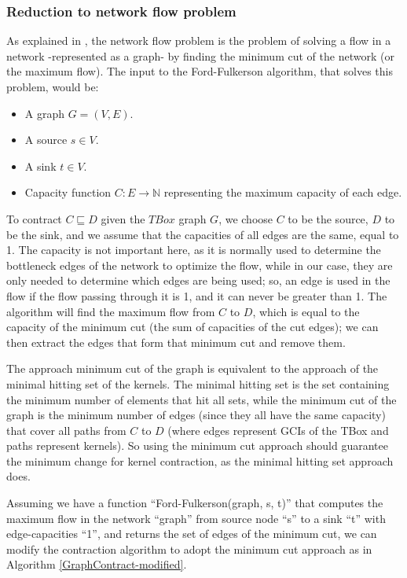 \subsubsection{Reduction to network flow problem}
As explained in \cite{alg}, the network flow problem is the problem of solving a flow in a network -represented as a graph- by finding the minimum cut of the network (or the maximum flow). The input to the Ford-Fulkerson algorithm, that solves this problem, would be:
\begin{itemize}
\item A graph $G = (V, E)$.
\item A source $s \in V$.
\item A sink $t \in V$.
\item Capacity function $C:E \rightarrow \mathbb{N}$ representing the maximum capacity of each edge.
\end{itemize}

To contract $C \sqsubseteq D$ given the $TBox$ graph $G$, we choose $C$ to be the source, $D$ to be the sink, and we assume that the capacities of all edges are the same, equal to 1. The capacity is not important here, as it is normally used to determine the bottleneck edges of the network to optimize the flow, while in our case, they are only needed to determine which edges are being used; so, an edge is used in the flow if the flow passing through it is 1, and it can never be greater than 1. The algorithm will find the maximum flow from $C$ to $D$, which is equal to the capacity of the minimum cut (the sum of capacities of the cut edges); we can then extract the edges that form that minimum cut and remove them.

The approach minimum cut of the graph is equivalent to the approach of the minimal hitting set of the kernels. The minimal hitting set is the set containing the minimum number of elements that hit all sets, while the minimum cut of the graph is the minimum number of edges (since they all have the same capacity) that cover all paths from $C$ to $D$ (where edges represent GCIs of the TBox and paths represent kernels). So using the minimum cut approach should guarantee the minimum change for kernel contraction, as the minimal hitting set approach does.

Assuming we have a function ``Ford-Fulkerson(graph, s, t)'' that computes the maximum flow in the network ``graph'' from source node ``s'' to a sink  ``t'' with edge-capacities ``1'', and returns the set of edges of the minimum cut, we can modify the contraction algorithm to adopt the minimum cut approach as in Algorithm \ref{GraphContract-modified}.

